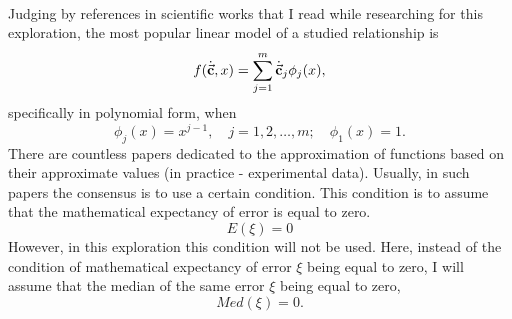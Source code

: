 \\
Judging by references in scientific works that I read while researching for this exploration, the most popular linear model of a studied relationship is
\begin{equation}
f(\dot{\vec{\textbf{c}}},x)= \sum\limits_{j=1}^{m} \dot{\vec{\textbf{c}}}_{j} \phi_{j}(x), \label{functionform}
\end{equation}
specifically in polynomial form, when
\begin{equation}
\phi_{j}(x)=x^{j-1},\quad j=1,2,\dots,m; \quad \phi_{1}(x) = 1.
\end{equation}
There are countless papers dedicated to the approximation of functions based on their approximate values (in practice - experimental data). Usually, in such papers the consensus is to use a certain condition. This condition is to assume that the mathematical expectancy of error is equal to zero. \cite{Plackett_1950}
\begin{equation}
E(\xi)=0
\end{equation}
 However, in this exploration this condition will not be used. Here, instead of the condition of mathematical expectancy of error $\xi$ being equal to zero, I will assume that the median of the same error $\xi$ being equal to zero, 
\begin{equation}
Med(\xi)=0.
\end{equation}
